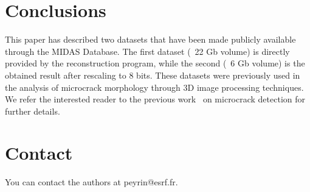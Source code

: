 \documentclass{InsightArticle}
\begin{document}
\section{Conclusions}
This paper has described two datasets that have been made publicly available
through the MIDAS Database. The first dataset  (~22 Gb volume) is directly
provided by the reconstruction program, while the second (~6 Gb volume) is the
obtained result after rescaling to 8 bits. These datasets were previously used in
the analysis of microcrack morphology through 3D image processing techniques. 
We refer the interested reader to the previous work~\cite{Larrue2011} on
microcrack detection for further details.

\section{Contact}

You can contact the authors at peyrin@esrf.fr.


%
%



\end{document}
